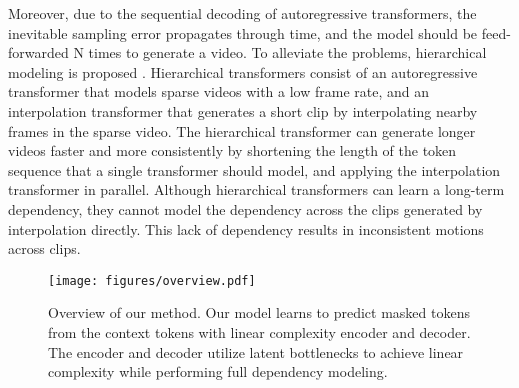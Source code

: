 \documentclass[10pt,twocolumn,letterpaper]{article}
\newcommand{\cutparagraphup}{\vspace*{-0.1in}}
\begin{document}
\ifdefined{} \fi
Moreover, due to the sequential decoding of autoregressive transformers, the inevitable sampling error propagates through time, and the model should be feed-forwarded N times to generate a video.
To alleviate the problems, hierarchical modeling is proposed  \cite{CogVid, TATS}. Hierarchical transformers consist of an autoregressive transformer that models sparse videos with a low frame rate, and an interpolation transformer that generates a short clip by interpolating nearby frames in the sparse video. The hierarchical transformer can generate longer videos faster and more consistently by shortening the length of the token sequence that a single transformer should model, and applying the interpolation transformer in parallel. Although hierarchical transformers can learn a long-term dependency, they cannot model the dependency across the clips generated by interpolation directly. This lack of dependency results in inconsistent motions across clips. 
\fi

\begin{figure*}[!ht]
    \centering
    \texttt{[image: figures/overview.pdf]}
    \vspace{-0.35cm}
    \caption{Overview of our method. Our model learns to predict masked tokens from the context tokens with linear complexity encoder and decoder. The encoder and decoder utilize latent bottlenecks to achieve linear complexity while performing full dependency modeling. 
}
    \label{fig:overview}
    \vspace{-0.4cm}
\end{figure*}
\cutparagraphup
\end{document}
